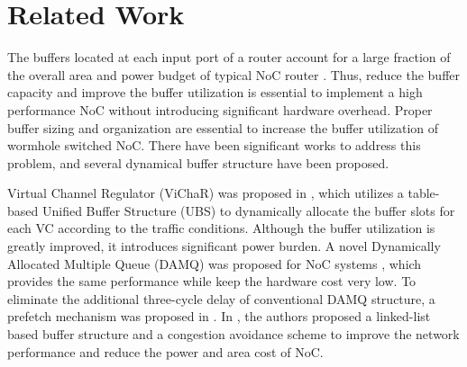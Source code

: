 \documentclass[10pt,conference]{IEEEtran}
\begin{document}
\section{Related Work}\label{related}
The buffers located at each input port of a router account for a large fraction of the overall area and power budget of typical NoC router \cite{1650108}\cite{ChPe03}. Thus, reduce the buffer capacity and improve the buffer utilization is essential to implement a high performance NoC without introducing significant hardware overhead. Proper buffer sizing and organization are essential to increase the buffer utilization of wormhole switched NoC. There have been significant works to address this problem, and several dynamical buffer structure have been proposed.

Virtual Channel Regulator (ViChaR) was proposed in \cite{NPKV06}, which utilizes a table-based Unified Buffer Structure (UBS) to dynamically allocate the buffer slots for each VC according to the traffic conditions. Although the buffer utilization is greatly improved, it introduces significant power burden. A novel Dynamically Allocated Multiple Queue (DAMQ) was proposed for NoC systems \cite{liu2006shared}, which provides the same performance while keep the hardware cost very low. To eliminate the additional three-cycle delay of conventional DAMQ structure, a prefetch mechanism was proposed in \cite{6310960}. In \cite{4555894}, the authors proposed a linked-list based buffer structure and a congestion avoidance scheme to improve the network performance and reduce the power and area cost of NoC.
\end{document}
